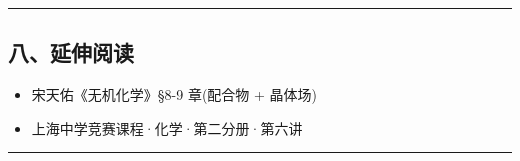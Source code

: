 \documentclass[a4paper,11pt]{ctexart}
\providecommand{\tightlist}{\setlength{\itemsep}{0pt}\setlength{\parskip}{0pt}}
\newcommand{\箭}{\ensuremath{\rightarrow}}
\newcommand{\左箭}{\ensuremath{\leftarrow}}
\newcommand{\上箭}{\ensuremath{\uparrow}}
\newcommand{\下箭}{\ensuremath{\downarrow}}
\newcommand{\衡}{\ensuremath{\rightleftharpoons}}
\newcommand{\双箭}{\ensuremath{\leftrightarrow}}
\newcommand{\约等于}{\ensuremath{\approx}}
\newcommand{\小于等于}{\ensuremath{\leq}}
\newcommand{\大于等于}{\ensuremath{\geq}}
\newcommand{\不等于}{\ensuremath{\neq}}
\newcommand{\西格马}{\ensuremath{\sigma}}
\newcommand{\派}{\ensuremath{\pi}}
\begin{document}
\begin{center}\rule{0.5\linewidth}{0.5pt}\end{center}

\subsection{八、延伸阅读}\label{ux516bux5ef6ux4f38ux9605ux8bfb}

\begin{itemize}
\tightlist
\item
  宋天佑《无机化学》§8-9 章(配合物 + 晶体场)
\item
  上海中学竞赛课程·化学·第二分册·第六讲
\end{itemize}

\begin{center}\rule{0.5\linewidth}{0.5pt}\end{center}
\end{document}

